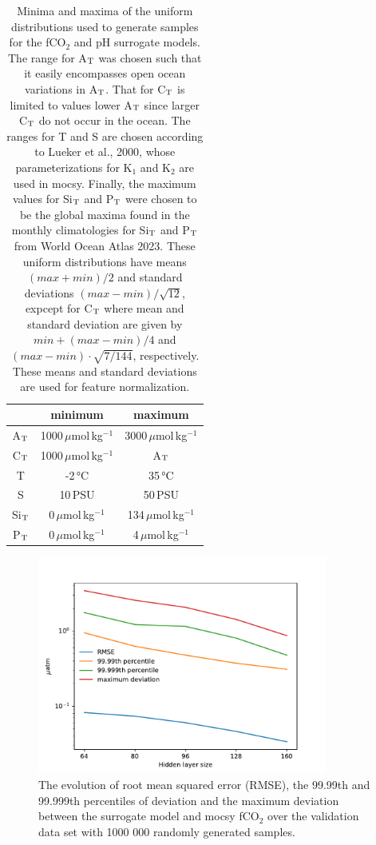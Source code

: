 \documentclass{article}
\begin{document}
	\begin{table}
		\centering
		\bgroup
		\def\arraystretch{1.5}
		\begin{tabular}{c|c|c}
			& minimum & maximum \\
			\hline 
			A$_\textup{T}$ & 1000\,$\mu$mol\,kg$^{-1}$ & 3000\,$\mu$mol\,kg$^{-1}$ \\
			\hline
			C$_\textup{T}$ & 1000\,$\mu$mol\,kg$^{-1}$ & A$_\textup{T}$ \\
			\hline
			T & -2\,°C & 35\,°C \\
			\hline
			S & 10\,PSU & 50\,PSU \\
			\hline
			Si$_\textup{T}$ & 0\,$\mu$mol\,kg$^{-1}$ & 134\,$\mu$mol\,kg$^{-1}$ \\
			\hline
			P$_\textup{T}$ & 0\,$\mu$mol\,kg$^{-1}$ & 4\,$\mu$mol\,kg$^{-1}$ \\
			
		\end{tabular}
		\egroup
		\caption{Minima and maxima of the uniform distributions used to generate samples for the fCO$_2$ and pH surrogate models. The range for A$_\textup{T}$ was chosen such that it easily encompasses open ocean variations in A$_\textup{T}$. That for C$_\textup{T}$ is limited to values lower A$_\textup{T}$ since larger C$_\textup{T}$ do not occur in the ocean. The ranges for T and S are chosen according to Lueker et al., 2000, whose parameterizations for K$_1$ and K$_2$ are used in mocsy. Finally, the maximum values for Si$_\textup{T}$ and P$_\textup{T}$ were chosen to be the global maxima found in the monthly climatologies for Si$_\textup{T}$ and P$_\textup{T}$ from World Ocean Atlas 2023. These uniform distributions have means $(max + min) / 2$ and standard deviations $(max - min) / \sqrt{12}$, expcept for C$_\textup{T}$ where mean and standard deviation are given by $min + (max - min) / 4$ and $(max - min) \cdot \sqrt{7 / 144}$, respectively. These means and standard deviations are used for feature normalization.}
		\label{tab:gen_data}
	\end{table}
	\begin{figure}
		\includegraphics[width=0.85\textwidth]{./figures/fco2_model_error_vs_hidden_layer_size.pdf}
		\caption{The evolution of root mean squared error (RMSE), the 99.99th and 99.999th percentiles of deviation and the maximum deviation between the surrogate model and mocsy fCO$_2$ over the validation data set with 1000 000 randomly generated samples.}
		\label{fig:surrogate_model_accuracy}
	\end{figure}
\end{document}
